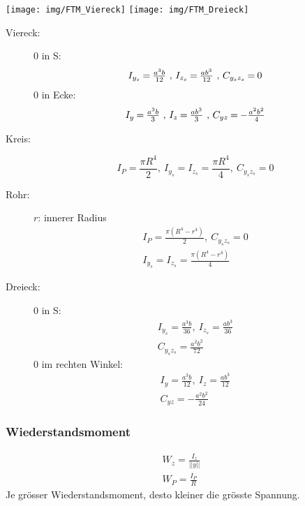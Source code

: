 \documentclass{article}
\begin{document}
\begin{multicols*}{4}
						\begin{center}
							\texttt{[image: img/FTM\_Viereck]}
							\hspace{.75cm}
							\texttt{[image: img/FTM\_Dreieck]}
						\end{center}
						
						\begin{description}
							\item[Viereck:]
								0 in S:
								\[
									\begin{array}{r@{\:=\:}l@{\ ,\ }r@{\:=\:}l@{\ ,\ }r@{\:=\:}l}
										I_{y_s} & \frac{a^3 b}{12} &
										I_{z_s} & \frac{a b^3}{12} &
										C_{y_s z_s} & 0
									\end{array}
								\]
								0 in Ecke:
								\[
									\begin{array}{r@{\:=\:}l@{\ ,\ }r@{\:=\:}l@{\ ,\ }r@{\:=\:}l}
										I_y & \frac{a^3 b}{3} & 
										I_z & \frac{a b^3}{3} & 
										C_{yz} & - \frac{a^2 b^2}{4}
									\end{array}
								\]
							\item[Kreis:] 
								\[
									I_P = \frac{\pi R^4}{2},\ 
									I_{y_s} = I_{z_s} = \frac{\pi R^4}{4},\ 
									C_{y_s z_s} = 0
								\]
							\item[Rohr:] $r$: innerer Radius 
								\begin{gather*}
									I_P = \frac{\pi (R^4 - r^4)}{2},\ 
									C_{y_s z_s} = 0 \\
									I_{y_s} = I_{z_s} = \frac{\pi (R^4 - r^4)}{4}
								\end{gather*}
							\item[Dreieck:]
									0 in S:
									\begin{gather*}
										I_{y_s} = \frac{a^3 b}{36} ,\ 
										I_{z_s} = \frac{a b^3}{36} \\
										C_{y_s z_s} = \frac{a^2 b^2}{72}
									\end{gather*}
									0 im rechten Winkel:
									\begin{gather*}
										I_y = \frac{a^3 b}{12} ,\ 
										I_z = \frac{a b^3}{12} \\ 
										C_{yz} = - \frac{a^2 b^2}{24}
									\end{gather*}
						\end{description}
				\subsubsection{Wiederstandsmoment} %
					\begin{gather*}
						W_z = \frac{I_z}{||y||}
						\\
						W_P = \frac{I_P}{R}
					\end{gather*}
					Je grösser Wiederstandsmoment, desto kleiner die grösste Spannung.

\end{multicols*}
\end{document}
